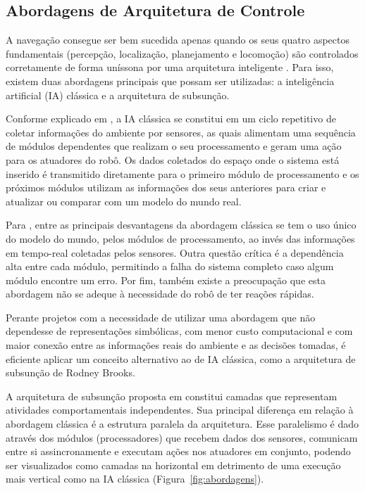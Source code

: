 \subsection{Abordagens de Arquitetura de Controle} %

A navegação consegue ser bem sucedida apenas quando os seus quatro aspectos fundamentais (percepção, localização, planejamento e locomoção) são controlados corretamente de forma uníssona por uma arquitetura inteligente \cite{mobileRobotsSiegwart:2011}. Para isso, existem duas abordagens principais que possam ser utilizadas: a inteligência artificial (IA) clássica e a arquitetura de subsunção.

Conforme explicado em \citet{practicalIndroductionNehmzow:2012}, a IA clássica se constitui em um ciclo repetitivo de coletar informações do ambiente por sensores, as quais alimentam uma sequência de módulos dependentes que realizam o seu processamento e geram uma ação para os atuadores do robô. Os dados coletados do espaço onde o sistema está inserido é transmitido diretamente para o primeiro módulo de processamento e os próximos módulos utilizam as informações dos seus anteriores para criar e atualizar ou comparar com um modelo do mundo real. 

Para \citet{practicalIndroductionNehmzow:2012}, entre as principais desvantagens da abordagem clássica  se tem o uso único do modelo do mundo, pelos módulos de processamento, ao invés das informações em tempo-real coletadas pelos sensores. Outra questão crítica é a dependência alta entre cada módulo, permitindo a falha do sistema completo caso algum módulo encontre um erro. Por fim, também existe a preocupação que esta abordagem não se adeque à necessidade do robô de ter reações rápidas.

Perante projetos com a necessidade de utilizar uma abordagem que não dependesse de representações simbólicas, com menor custo computacional e com maior conexão entre as informações reais do ambiente e as decisões tomadas, é eficiente aplicar um conceito alternativo ao de IA clássica, como a  arquitetura de subsunção de Rodney Brooks.

A arquitetura de subsunção proposta em \citet{brooks85} constitui camadas que representam atividades comportamentais independentes. Sua principal diferença em relação à abordagem clássica é a estrutura paralela da arquitetura. Esse paralelismo é dado através dos módulos (processadores) que recebem dados dos sensores, comunicam entre si assincronamente e executam ações nos atuadores em conjunto, podendo ser visualizados como camadas na horizontal em detrimento de uma execução mais vertical como na IA clássica (Figura~\ref{fig:abordagens}). 

